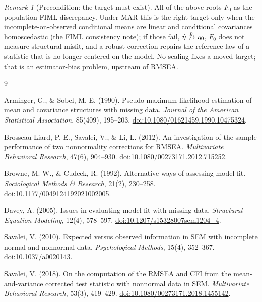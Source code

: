 \documentclass[11pt]{article}
\newcommand{\pto}{\xrightarrow{p}}
\theoremstyle{plain}
\theoremstyle{remark}
\newtheorem*{remark}{Remark}
\begin{document}
\begin{remark}[Precondition: the target must exist]
All of the above roots $F_0$ as the population FIML discrepancy. Under MAR this
is the right target only when the incomplete-on-observed conditional means are
linear and conditional covariances homoscedastic (the FIML consistency note); if
those fail, $\hat\eta\not\pto\eta_0$, $F_0$ does not measure structural misfit,
and a robust correction repairs the reference law of a statistic that is no
longer centered on the model. No scaling fixes a moved target; that is an
estimator-bias problem, upstream of RMSEA.
\end{remark}

\begin{thebibliography}{9}

Arminger, G., \& Sobel, M. E. (1990).
Pseudo-maximum likelihood estimation of mean and covariance structures with
missing data.
\emph{Journal of the American Statistical Association}, 85(409), 195--203.
\href{https://doi.org/10.1080/01621459.1990.10475324}{doi:10.1080/01621459.1990.10475324}.

Brosseau-Liard, P. E., Savalei, V., \& Li, L. (2012).
An investigation of the sample performance of two nonnormality corrections for
RMSEA.
\emph{Multivariate Behavioral Research}, 47(6), 904--930.
\href{https://doi.org/10.1080/00273171.2012.715252}{doi:10.1080/00273171.2012.715252}.

Browne, M. W., \& Cudeck, R. (1992).
Alternative ways of assessing model fit.
\emph{Sociological Methods \& Research}, 21(2), 230--258.
\href{https://doi.org/10.1177/0049124192021002005}{doi:10.1177/0049124192021002005}.

Davey, A. (2005).
Issues in evaluating model fit with missing data.
\emph{Structural Equation Modeling}, 12(4), 578--597.
\href{https://doi.org/10.1207/s15328007sem1204_4}{doi:10.1207/s15328007sem1204\_4}.

Savalei, V. (2010).
Expected versus observed information in SEM with incomplete normal and nonnormal
data.
\emph{Psychological Methods}, 15(4), 352--367.
\href{https://doi.org/10.1037/a0020143}{doi:10.1037/a0020143}.

Savalei, V. (2018).
On the computation of the RMSEA and CFI from the mean-and-variance corrected test
statistic with nonnormal data in SEM.
\emph{Multivariate Behavioral Research}, 53(3), 419--429.
\href{https://doi.org/10.1080/00273171.2018.1455142}{doi:10.1080/00273171.2018.1455142}.


\end{thebibliography}
\end{document}
